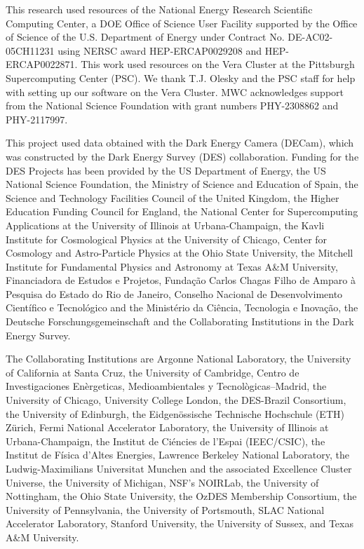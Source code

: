 \documentclass[twocolumn]{aastex631}
\begin{document}
This research used resources of the National Energy Research Scientific Computing Center, a DOE Office of Science User Facility supported by the Office of Science of the U.S.
Department of Energy under Contract No. DE-AC02-05CH11231 using NERSC award HEP-ERCAP0029208 and HEP-ERCAP0022871. This work used resources on the Vera Cluster at the Pittsburgh Supercomputing Center (PSC).
We thank T.J. Olesky and the PSC staff for help with setting up our software on the Vera Cluster.
MWC acknowledges support from the National Science Foundation with grant numbers PHY-2308862 and PHY-2117997.

This project used data obtained with the Dark Energy Camera (DECam), which was constructed by the Dark Energy Survey (DES) collaboration.
Funding for the DES Projects has been provided by the US Department of Energy, the US National Science Foundation, the Ministry of Science and Education of Spain, the Science and Technology Facilities Council of the United Kingdom, the Higher Education Funding Council for England, the National Center for Supercomputing Applications at the University of Illinois at Urbana-Champaign, the Kavli Institute for Cosmological Physics at the University of Chicago, Center for Cosmology and Astro-Particle Physics at the Ohio State University, the Mitchell Institute for Fundamental Physics and Astronomy at Texas A\&M University, Financiadora de Estudos e Projetos, Fundação Carlos Chagas Filho de Amparo à Pesquisa do Estado do Rio de Janeiro, Conselho Nacional de Desenvolvimento Científico e Tecnológico and the Ministério da Ciência, Tecnologia e Inovação, the Deutsche Forschungsgemeinschaft and the Collaborating Institutions in the Dark Energy Survey.

The Collaborating Institutions are Argonne National Laboratory, the University of California at Santa Cruz, the University of Cambridge, Centro de Investigaciones En\`ergeticas, Medioambientales y Tecnol\`ogicas–Madrid, the University of Chicago, University College London, the DES-Brazil Consortium, the University of Edinburgh, the Eidgenössische Technische Hochschule (ETH) Zürich, Fermi National Accelerator Laboratory, the University of Illinois at Urbana-Champaign, the Institut de Ci\'encies de l’Espai (IEEC/CSIC), the Institut de F\'isica d’Altes Energies, Lawrence Berkeley National Laboratory, the Ludwig-Maximilians Universit\:at M\:unchen and the associated Excellence Cluster Universe, the University of Michigan, NSF’s NOIRLab, the University of Nottingham, the Ohio State University, the OzDES Membership Consortium, the University of Pennsylvania, the University of Portsmouth, SLAC National Accelerator Laboratory, Stanford University, the University of Sussex, and Texas A\&M University.
\end{document}
